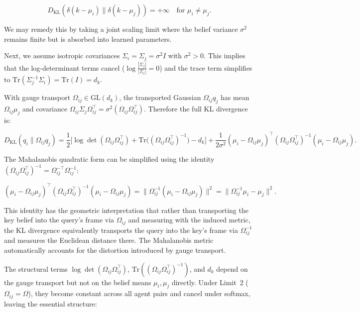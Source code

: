 \documentclass[twoside,11pt]{article}
\begin{document}
\begin{equation}
D_{\mathrm{KL}}(\delta(k - \mu_i) \| \delta(k - \mu_j)) = +\infty \quad \text{for } \mu_i \neq \mu_j.
\end{equation}

We may remedy this by taking a joint scaling limit where the belief variance $\sigma^2$ remains finite but is absorbed into learned parameters.

Next, we assume isotropic covariances $\Sigma_i = \Sigma_j = \sigma^2 I$ with $\sigma^2 > 0$. This implies that the log-determinant terms cancel ($\log\frac{|\Sigma_j|}{|\Sigma_i|} = 0$) and the trace term simplifies to $\mathrm{Tr}(\Sigma_j^{-1}\Sigma_i) = \mathrm{Tr}(I) = d_k$.

With gauge transport $\Omega_{ij} \in \mathrm{GL}(d_k)$, the transported Gaussian $\Omega_{ij}q_j$ has mean $\Omega_{ij}\mu_j$ and covariance $\Omega_{ij}\Sigma_j\Omega_{ij}^\top = \sigma^2(\Omega_{ij}\Omega_{ij}^\top)$. Therefore the full KL divergence is:

\begin{equation}
D_{\mathrm{KL}}(q_i \| \Omega_{ij}q_j) = \frac{1}{2}\Big[\log\det(\Omega_{ij}\Omega_{ij}^\top) + \mathrm{Tr}\big((\Omega_{ij}\Omega_{ij}^\top)^{-1}\big) - d_k\Big] + \frac{1}{2\sigma^2}(\mu_i - \Omega_{ij}\mu_j)^\top(\Omega_{ij}\Omega_{ij}^\top)^{-1}(\mu_i - \Omega_{ij}\mu_j).
\end{equation}

The Mahalanobis quadratic form can be simplified using the identity $(\Omega_{ij}\Omega_{ij}^\top)^{-1} = \Omega_{ij}^{-\top}\Omega_{ij}^{-1}$:

\begin{equation}
(\mu_i - \Omega_{ij}\mu_j)^\top(\Omega_{ij}\Omega_{ij}^\top)^{-1}(\mu_i - \Omega_{ij}\mu_j) = \|\Omega_{ij}^{-1}(\mu_i - \Omega_{ij}\mu_j)\|^2 = \|\Omega_{ij}^{-1}\mu_i - \mu_j\|^2.
\label{eq:mahalanobis_identity}
\end{equation}

This identity has the geometric interpretation that rather than transporting the key belief into the query's frame via $\Omega_{ij}$ and measuring with the induced metric, the KL divergence equivalently transports the query into the key's frame via $\Omega_{ij}^{-1}$ and measures the Euclidean distance there. The Mahalanobis metric automatically accounts for the distortion introduced by gauge transport.

The structural terms $\log\det(\Omega_{ij}\Omega_{ij}^\top)$, $\mathrm{Tr}((\Omega_{ij}\Omega_{ij}^\top)^{-1})$, and $d_k$ depend on the gauge transport but not on the belief means $\mu_i, \mu_j$ directly. Under Limit~2 ($\Omega_{ij} = \Omega$), they become constant across all agent pairs and cancel under softmax, leaving the essential structure:
\end{document}
